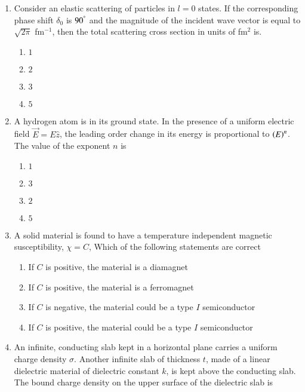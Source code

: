 \documentclass[journal]{IEEEtran}
\begin{document}
\begin{enumerate}
{\begin{enumerate}
\end{enumerate}
}
\item{
Consider an elastic scattering of particles in $l = 0$ states. If the corresponding phase shift $\delta_0$ is $90^{\degree}$ and the magnitude of the incident wave vector is equal to $\sqrt{2\pi}$ fm$^{-1}$, then the total scattering cross section in units of fm$^2$ is.
\begin{multicols}{4}
\begin{enumerate}
\item $1$
\item $2$
\item $3$
\item $5$
\end{enumerate}
\end{multicols}
}
\item{
A hydrogen atom is in its ground state. In the presence of a uniform electric field $\overrightarrow{E} = E\hat{z}$, the leading order change in its energy is proportional to $\left(E\right)^n$. The value of the exponent $n$ is
\begin{multicols}{4}
\begin{enumerate}
\item $1$
\item $3$
\item $2$
\item $5$
\end{enumerate}
\end{multicols}
}
\item{
A solid material is found to have a temperature independent magnetic susceptibility, $\chi=C$, Which of the following statements are correct
\begin{enumerate}
\item If $C$ is positive, the material is a diamagnet
\item If $C$ is positive, the material is a ferromagnet
\item If $C$ is negative, the material could be a type $I$ semiconductor
\item If $C$ is positive, the material could be a type $I$ semiconductor
\end{enumerate}
}
\item{
An infinite, conducting slab kept in a horizontal plane carries a uniform charge density $\sigma$. Another infinite slab of thickness $t$, made of a linear dielectric material of dielectric constant $k$, is kept above the conducting slab. The bound charge density on the upper surface of the dielectric slab is
\begin{multicols}{4}

\end{multicols}}
\end{enumerate}
\end{document}
